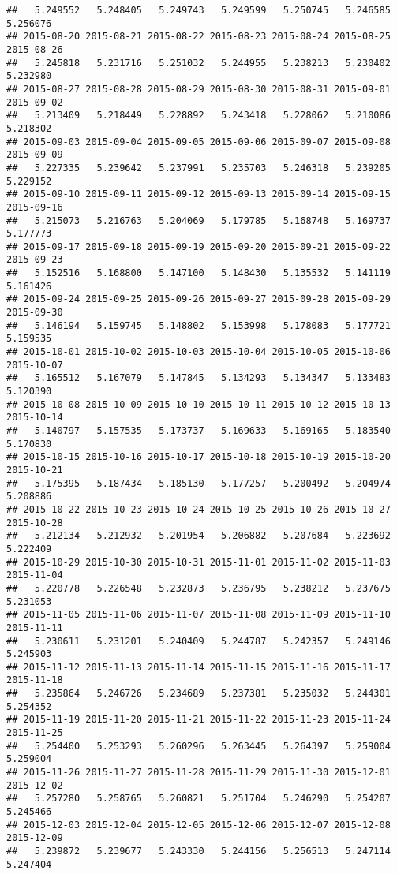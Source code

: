 \documentclass[
]{article}
\begin{document}
\begin{verbatim}
##   5.249552   5.248405   5.249743   5.249599   5.250745   5.246585   5.256076 
## 2015-08-20 2015-08-21 2015-08-22 2015-08-23 2015-08-24 2015-08-25 2015-08-26 
##   5.245818   5.231716   5.251032   5.244955   5.238213   5.230402   5.232980 
## 2015-08-27 2015-08-28 2015-08-29 2015-08-30 2015-08-31 2015-09-01 2015-09-02 
##   5.213409   5.218449   5.228892   5.243418   5.228062   5.210086   5.218302 
## 2015-09-03 2015-09-04 2015-09-05 2015-09-06 2015-09-07 2015-09-08 2015-09-09 
##   5.227335   5.239642   5.237991   5.235703   5.246318   5.239205   5.229152 
## 2015-09-10 2015-09-11 2015-09-12 2015-09-13 2015-09-14 2015-09-15 2015-09-16 
##   5.215073   5.216763   5.204069   5.179785   5.168748   5.169737   5.177773 
## 2015-09-17 2015-09-18 2015-09-19 2015-09-20 2015-09-21 2015-09-22 2015-09-23 
##   5.152516   5.168800   5.147100   5.148430   5.135532   5.141119   5.161426 
## 2015-09-24 2015-09-25 2015-09-26 2015-09-27 2015-09-28 2015-09-29 2015-09-30 
##   5.146194   5.159745   5.148802   5.153998   5.178083   5.177721   5.159535 
## 2015-10-01 2015-10-02 2015-10-03 2015-10-04 2015-10-05 2015-10-06 2015-10-07 
##   5.165512   5.167079   5.147845   5.134293   5.134347   5.133483   5.120390 
## 2015-10-08 2015-10-09 2015-10-10 2015-10-11 2015-10-12 2015-10-13 2015-10-14 
##   5.140797   5.157535   5.173737   5.169633   5.169165   5.183540   5.170830 
## 2015-10-15 2015-10-16 2015-10-17 2015-10-18 2015-10-19 2015-10-20 2015-10-21 
##   5.175395   5.187434   5.185130   5.177257   5.200492   5.204974   5.208886 
## 2015-10-22 2015-10-23 2015-10-24 2015-10-25 2015-10-26 2015-10-27 2015-10-28 
##   5.212134   5.212932   5.201954   5.206882   5.207684   5.223692   5.222409 
## 2015-10-29 2015-10-30 2015-10-31 2015-11-01 2015-11-02 2015-11-03 2015-11-04 
##   5.220778   5.226548   5.232873   5.236795   5.238212   5.237675   5.231053 
## 2015-11-05 2015-11-06 2015-11-07 2015-11-08 2015-11-09 2015-11-10 2015-11-11 
##   5.230611   5.231201   5.240409   5.244787   5.242357   5.249146   5.245903 
## 2015-11-12 2015-11-13 2015-11-14 2015-11-15 2015-11-16 2015-11-17 2015-11-18 
##   5.235864   5.246726   5.234689   5.237381   5.235032   5.244301   5.254352 
## 2015-11-19 2015-11-20 2015-11-21 2015-11-22 2015-11-23 2015-11-24 2015-11-25 
##   5.254400   5.253293   5.260296   5.263445   5.264397   5.259004   5.259004 
## 2015-11-26 2015-11-27 2015-11-28 2015-11-29 2015-11-30 2015-12-01 2015-12-02 
##   5.257280   5.258765   5.260821   5.251704   5.246290   5.254207   5.245466 
## 2015-12-03 2015-12-04 2015-12-05 2015-12-06 2015-12-07 2015-12-08 2015-12-09 
##   5.239872   5.239677   5.243330   5.244156   5.256513   5.247114   5.247404 

\end{verbatim}
\end{document}
